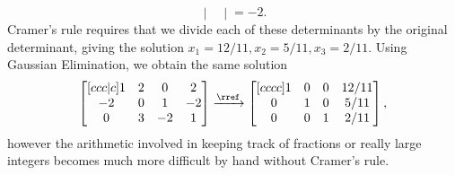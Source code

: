 \begin{example}
$$\begin{vmatrix}
\end {vmatrix}  
=-2 .$$
Cramer's rule requires that we divide each of these determinants by the original determinant, giving the solution $x_1=12/11, x_2 = 5/11, x_3 = 2/11$.  Using Gaussian Elimination, we obtain the same solution 
$$ \begin {bmatrix}[ccc|c] 1&2&0&2\\-2&0&1&-2\\0&3&-2&1\end {bmatrix}\xrightarrow{\rref}
\begin {bmatrix}[cccc] 1&0&0&12/11
\\0&1&0&5/11\\0&0&1&2/11\end {bmatrix} 
, $$
however the arithmetic involved in keeping track of fractions or really large integers becomes much more difficult by hand without Cramer's rule.
\end{example}

